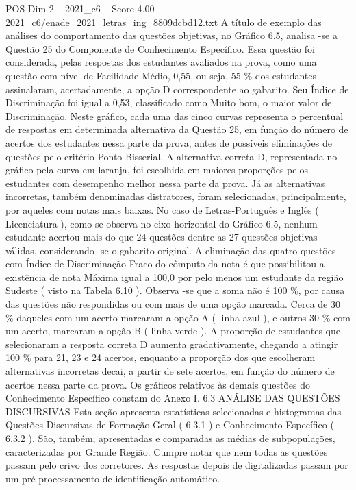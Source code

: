 \begin{textsample}{POS Dim 2 – 2021\_c6 – Score 4.00 – 2021\_c6/enade\_2021\_letras\_ing\_8809dcbd12.txt}
A título de exemplo das análises do comportamento das questões objetivas, no Gráfico 6.5, analisa -se a Questão 25 do Componente de Conhecimento Específico.
Essa questão foi considerada, pelas respostas dos estudantes avaliados na prova, como uma questão com nível de Facilidade Médio, 0,55, ou seja, 55 \% dos estudantes assinalaram, acertadamente, a opção D correspondente ao gabarito.
Seu Índice de Discriminação foi igual a 0,53, classificado como Muito bom, o maior valor de Discriminação.
Neste gráfico, cada uma das cinco curvas representa o percentual de respostas em determinada alternativa da Questão 25, em função do número de acertos dos estudantes nessa parte da prova, antes de possíveis eliminações de questões pelo critério Ponto-Bisserial.
A alternativa correta D, representada no gráfico pela curva em laranja, foi escolhida em maiores proporções pelos estudantes com desempenho melhor nessa parte da prova.
Já as alternativas incorretas, também denominadas distratores, foram selecionadas, principalmente, por aqueles com notas mais baixas.
No caso de Letras-Português e Inglês ( Licenciatura ), como se observa no eixo horizontal do Gráfico 6.5, nenhum estudante acertou mais do que 24 questões dentre as 27 questões objetivas válidas, considerando -se o gabarito original.
A eliminação das quatro questões com Índice de Discriminação Fraco do cômputo da nota é que possibilitou a existência de nota Máxima igual a 100,0 por pelo menos um estudante da região Sudeste ( visto na Tabela 6.10 ).
Observa -se que a soma não é 100 \%, por causa das questões não respondidas ou com mais de uma opção marcada.
Cerca de 30 \% daqueles com um acerto marcaram a opção A ( linha azul ), e outros 30 \% com um acerto, marcaram a opção B ( linha verde ).
A proporção de estudantes que selecionaram a resposta correta D aumenta gradativamente, chegando a atingir 100 \% para 21, 23 e 24 acertos, enquanto a proporção dos que escolheram alternativas incorretas decai, a partir de sete acertos, em função do número de acertos nessa parte da prova.
Os gráficos relativos às demais questões do Conhecimento Específico constam do Anexo I. 6.3 ANÁLISE DAS QUESTÕES DISCURSIVAS Esta seção apresenta estatísticas selecionadas e histogramas das Questões Discursivas de Formação Geral ( 6.3.1 ) e Conhecimento Específico ( 6.3.2 ).
São, também, apresentadas e comparadas as médias de subpopulações, caracterizadas por Grande Região.
Cumpre notar que nem todas as questões passam pelo crivo dos corretores.
As respostas depois de digitalizadas passam por um pré-processamento de identificação automático.

\end{textsample}
